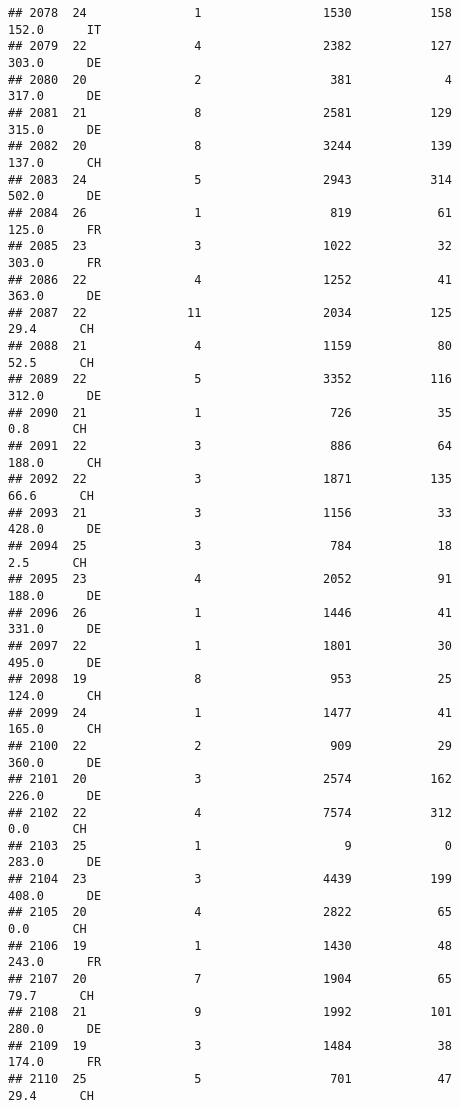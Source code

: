 \documentclass[
]{article}
\begin{document}
\begin{verbatim}
## 2078  24               1                 1530           158    152.0      IT
## 2079  22               4                 2382           127    303.0      DE
## 2080  20               2                  381             4    317.0      DE
## 2081  21               8                 2581           129    315.0      DE
## 2082  20               8                 3244           139    137.0      CH
## 2083  24               5                 2943           314    502.0      DE
## 2084  26               1                  819            61    125.0      FR
## 2085  23               3                 1022            32    303.0      FR
## 2086  22               4                 1252            41    363.0      DE
## 2087  22              11                 2034           125     29.4      CH
## 2088  21               4                 1159            80     52.5      CH
## 2089  22               5                 3352           116    312.0      DE
## 2090  21               1                  726            35      0.8      CH
## 2091  22               3                  886            64    188.0      CH
## 2092  22               3                 1871           135     66.6      CH
## 2093  21               3                 1156            33    428.0      DE
## 2094  25               3                  784            18      2.5      CH
## 2095  23               4                 2052            91    188.0      DE
## 2096  26               1                 1446            41    331.0      DE
## 2097  22               1                 1801            30    495.0      DE
## 2098  19               8                  953            25    124.0      CH
## 2099  24               1                 1477            41    165.0      CH
## 2100  22               2                  909            29    360.0      DE
## 2101  20               3                 2574           162    226.0      DE
## 2102  22               4                 7574           312      0.0      CH
## 2103  25               1                    9             0    283.0      DE
## 2104  23               3                 4439           199    408.0      DE
## 2105  20               4                 2822            65      0.0      CH
## 2106  19               1                 1430            48    243.0      FR
## 2107  20               7                 1904            65     79.7      CH
## 2108  21               9                 1992           101    280.0      DE
## 2109  19               3                 1484            38    174.0      FR
## 2110  25               5                  701            47     29.4      CH

\end{verbatim}
\end{document}
